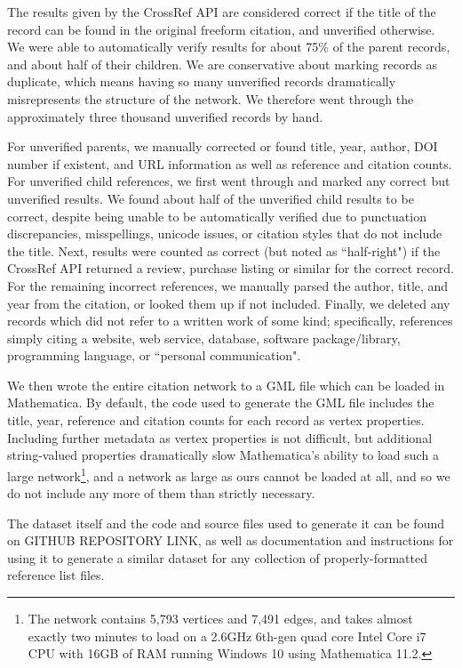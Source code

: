 \documentclass[12pt]{thesis}
\theoremstyle{plain}
\theoremstyle{definition}
\theoremstyle{remark}
\begin{document}
The results given by the CrossRef API are considered correct if the title of the record can be found in the original freeform citation, and unverified otherwise. We were able to automatically verify results for about 75\% of the parent records, and about half of their children. We are conservative about marking records as duplicate, which means having so many unverified records dramatically misrepresents the structure of the network. We therefore went through the approximately three thousand unverified records by hand.

For unverified parents, we manually corrected or found title, year, author, DOI number if existent, and URL information as well as reference and citation counts. For unverified child references, we first went through and marked any correct but unverified results. We found about half of the unverified child results to be correct, despite being unable to be automatically verified due to punctuation discrepancies, misspellings, unicode issues, or citation styles that do not include the title. Next, results were counted as correct (but noted as ``half-right") if the CrossRef API returned a review, purchase listing or similar for the correct record. For the remaining incorrect references, we manually parsed the author, title, and year from the citation, or looked them up if not included. Finally, we deleted any records which did not refer to a written work of some kind; specifically, references simply citing a website, web service, database, software package/library, programming language, or ``personal communication".

We then wrote the entire citation network to a GML file which can be loaded in Mathematica. By default, the code used to generate the GML file includes the title, year, reference and citation counts for each record as vertex properties. Including further metadata as vertex properties is not difficult, but additional string-valued properties dramatically slow Mathematica's ability to load such a large network\footnote{The network contains 5,793 vertices and 7,491 edges, and takes almost exactly two minutes to load on a 2.6GHz 6th-gen quad core Intel Core i7 CPU with 16GB of RAM running Windows 10 using Mathematica 11.2.}, and a network as large as ours cannot be loaded at all, and so we do not include any more of them than strictly necessary.

The dataset itself and the code and source files used to generate it can be found on GITHUB REPOSITORY LINK, as well as documentation and instructions for using it to generate a similar dataset for any collection of properly-formatted reference list files.
\end{document}
